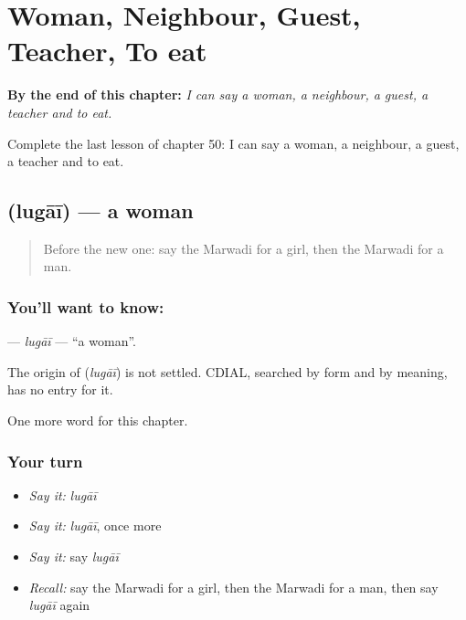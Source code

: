 
\chapter{Woman, Neighbour, Guest, Teacher, To eat}
\label{ch:mw-woman-neighbour-guest-teacher-to-eat}

\begin{chapteropening}
\textbf{By the end of this chapter:} \emph{I can say a woman, a neighbour, a guest, a teacher and to eat.}

Complete the last lesson of chapter 50: I can say a woman, a neighbour, a guest, a teacher and to eat.
\end{chapteropening}

\section[\texorpdfstring{\mw{लुगाई} (lugāī)}{लुगाई (lugāī)}]{ (lugāī) — a woman}

\label{lesson:MW-C50-lugai}



\begin{quote}
Before the new one: say the Marwadi for a girl, then the Marwadi for a man.
\end{quote}

\subsection*{You'll want to know: }
\textbf{} — \emph{lugāī} — \textquotedblleft{}a woman\textquotedblright{}.

\begin{cousinweb}
The origin of \textbf{} (\emph{lugāī}) is not settled. CDIAL, searched by form and by meaning, has no entry for it.
\end{cousinweb}

\begin{grammarlens}[title={What you've built}]
One more word for this chapter.
\end{grammarlens}

\subsection*{Your turn}
\begin{itemize}
\raggedright
  \item \emph{Say it:} \emph{lugāī}
  \item \emph{Say it:} \emph{lugāī}, once more
  \item \emph{Say it:} say \emph{lugāī}
  \item \emph{Recall:} say the Marwadi for a girl, then the Marwadi for a man, then say \emph{lugāī} again
\end{itemize}

